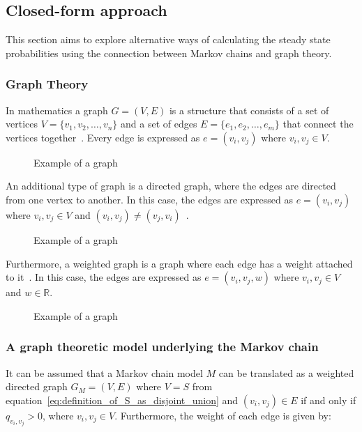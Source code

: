 \subsection{Closed-form approach}

This section aims to explore alternative ways of calculating the steady state
probabilities using the connection between Markov chains and graph
theory.

\subsubsection{Graph Theory}
In mathematics a graph \(G = (V, E)\) is a structure that consists of a set of
vertices \(V = \{v_1, v_2, \dots, v_n\}\) and a set of edges \(E = \{e_1, e_2,
\dots, e_m\}\) that connect the vertices together~\cite{bender2010lists}.
Every edge is expressed as \(e = (v_i, v_j)\) where \(v_i, v_j \in V\).

\begin{figure}[H]
    \centering
    
    \caption{Example of a graph}
    \label{fig:example_of_graph}
\end{figure}

An additional type of graph is a directed graph, where the edges are directed
from one vertex to another.
In this case, the edges are expressed as \(e = (v_i, v_j)\) where \(v_i, v_j 
\in V\) and \((v_i, v_j) \neq (v_j, v_i)\)~\cite{balakrishnan2012textbook}.

\begin{figure}[H]
    \centering
    
    \caption{Example of a graph}
    \label{fig:example_of_directed_graph}
\end{figure}

Furthermore, a weighted graph is a graph where each edge has a weight attached
to it~\cite{krukowski2021approximate}.
In this case, the edges are expressed as \(e = (v_i, v_j, w)\) where \(v_i, v_j
\in V\) and \(w \in \mathbb{R}\).

\begin{figure}[H]
    \centering
    
    \caption{Example of a graph}
    \label{fig:example_of_weighted_directed_graph}
\end{figure}

\subsubsection{A graph theoretic model underlying the Markov chain}
It can be assumed that a Markov chain model \(M\) can be translated as a
weighted directed graph \(G_M = (V, E)\) where \(V=S\) from
equation~\eqref{eq:definition_of_S_as_disjoint_union} and \((v_i, v_j)\in E\) if
and only if \(q_{v_i, v_j}>0\), where \(v_i, v_j \in V\).
Furthermore, the weight of each edge is given by:

